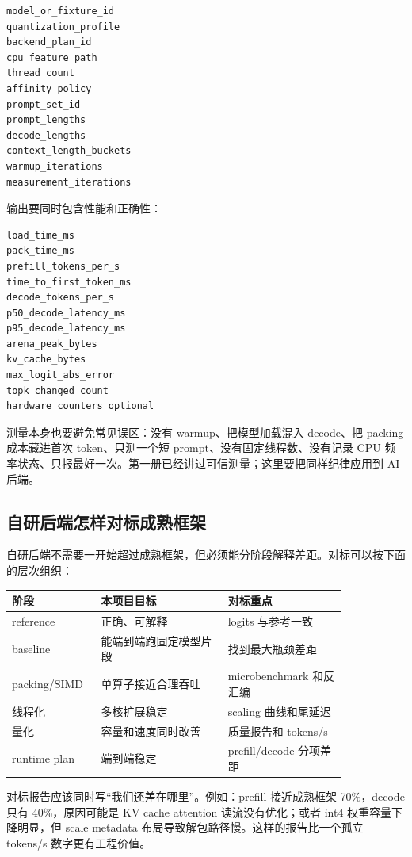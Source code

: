 \begin{lstlisting}[numbers=none,caption={CPU 后端 benchmark 输入}]
model_or_fixture_id
quantization_profile
backend_plan_id
cpu_feature_path
thread_count
affinity_policy
prompt_set_id
prompt_lengths
decode_lengths
context_length_buckets
warmup_iterations
measurement_iterations
\end{lstlisting}

输出要同时包含性能和正确性：

\begin{lstlisting}[numbers=none,caption={CPU 后端 benchmark 输出}]
load_time_ms
pack_time_ms
prefill_tokens_per_s
time_to_first_token_ms
decode_tokens_per_s
p50_decode_latency_ms
p95_decode_latency_ms
arena_peak_bytes
kv_cache_bytes
max_logit_abs_error
topk_changed_count
hardware_counters_optional
\end{lstlisting}

测量本身也要避免常见误区：没有 warmup、把模型加载混入 decode、把 packing 成本藏进首次 token、只测一个短 prompt、没有固定线程数、没有记录 CPU 频率状态、只报最好一次。第一册已经讲过可信测量；这里要把同样纪律应用到 AI 后端。

\subsection{自研后端怎样对标成熟框架}

自研后端不需要一开始超过成熟框架，但必须能分阶段解释差距。对标可以按下面的层次组织：

\begin{center}
\begin{tabular}{p{0.18\linewidth}p{0.34\linewidth}p{0.32\linewidth}}
\toprule
阶段 & 本项目目标 & 对标重点 \\
\midrule
reference & 正确、可解释 & logits 与参考一致 \\
baseline & 能端到端跑固定模型片段 & 找到最大瓶颈差距 \\
packing/SIMD & 单算子接近合理吞吐 & microbenchmark 和反汇编 \\
线程化 & 多核扩展稳定 & scaling 曲线和尾延迟 \\
量化 & 容量和速度同时改善 & 质量报告和 tokens/s \\
runtime plan & 端到端稳定 & prefill/decode 分项差距 \\
\bottomrule
\end{tabular}
\end{center}

对标报告应该同时写“我们还差在哪里”。例如：prefill 接近成熟框架 70\%，decode 只有 40\%，原因可能是 KV cache attention 读流没有优化；或者 int4 权重容量下降明显，但 scale metadata 布局导致解包路径慢。这样的报告比一个孤立 tokens/s 数字更有工程价值。

